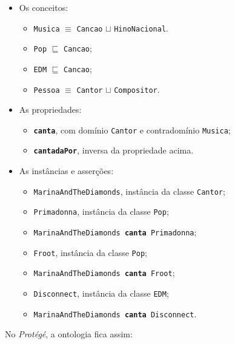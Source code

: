 \begin{itemize}
	\item Os conceitos: 
	\begin{itemize}
		\item \texttt{Musica} $ \equiv $ \texttt{Cancao} $ \sqcup $ \texttt{HinoNacional}.
		\item \texttt{Pop} $ \sqsubseteq $ \texttt{Cancao};
		\item \texttt{EDM} $ \sqsubseteq $ \texttt{Cancao};
		\item \texttt{Pessoa} $ \equiv $ \texttt{Cantor} $ \sqcup $ \texttt{Compositor}.
	\end{itemize}
	\item As propriedades:
	\begin{itemize}
		\item \textbf{\texttt{canta}}, com domínio \texttt{Cantor} e contradomínio \texttt{Musica};
		\item \textbf{\texttt{cantadaPor}}, inversa da propriedade acima.
	\end{itemize}
	\item As instâncias e asserções:
	\begin{itemize}
		\item \texttt{MarinaAndTheDiamonds}, instância da classe \texttt{Cantor};
		\item \texttt{Primadonna}, instância da classe \texttt{Pop};
		\item \texttt{MarinaAndTheDiamonds \textbf{canta} Primadonna};
		\item \texttt{Froot}, instância da classe \texttt{Pop};
		\item \texttt{MarinaAndTheDiamonds \textbf{canta} Froot};
		\item \texttt{Disconnect}, instância da classe \texttt{EDM};
		\item \texttt{MarinaAndTheDiamonds \textbf{canta} Disconnect}.	
	\end{itemize}
\end{itemize}

No \textit{Protégé}, a ontologia fica assim:

